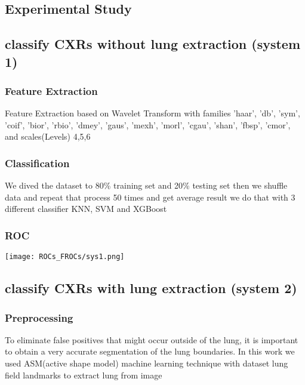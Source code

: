 \documentclass[hidelinks,12pt,xcolor=table]{article}
\begin{document}
\begin{multicols}{2}
\section{Experimental Study}

\subsection{classify CXRs without lung extraction (system 1)}
\subsubsection{Feature Extraction}
Feature Extraction based on Wavelet Transform with families
'haar', 'db', 'sym', 'coif', 'bior', 'rbio', 'dmey', 'gaus',
'mexh', 'morl', 'cgau', 'shan', 'fbsp', 'cmor',
and scales(Levels) 4,5,6   



\subsubsection{Classification}

We dived the dataset to 80\% training set and 20\% testing set then we shuffle data and repeat that process 50 times and get average result we do that with 3 different classifier KNN, SVM and XGBoost

\subsubsection{ROC}

\begin{center}
  \centering
  \texttt{[image: ROCs\_FROCs/sys1.png]}
\end{center}





\subsection{classify CXRs with lung extraction (system 2)}
\subsubsection{Preprocessing}
To eliminate false positives that might occur outside of
the lung, it is important to obtain a very accurate
segmentation of the lung boundaries. In this work we used ASM(active shape model) machine learning technique with dataset lung field landmarks to extract lung from image



\end{multicols}
\end{document}
